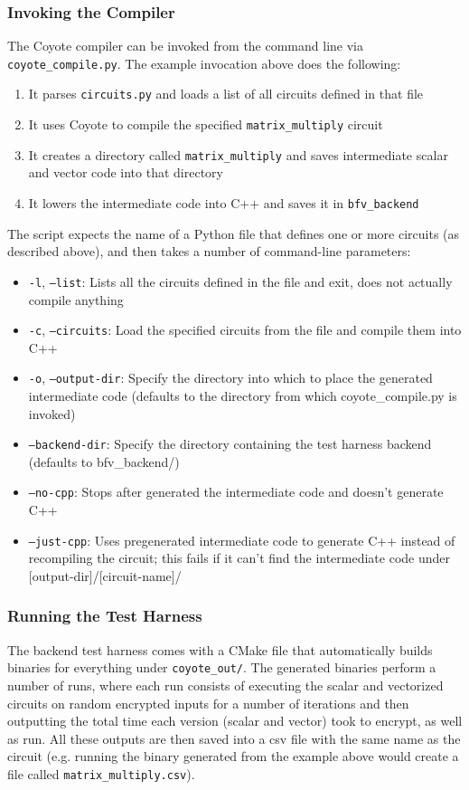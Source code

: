 \subsubsection{Invoking the Compiler}
The Coyote compiler can be invoked from the command line via {\tt coyote\_compile.py}. The example invocation above does the following:
\begin{enumerate}
    \item It parses {\tt circuits.py} and loads a list of all circuits defined in that file
    \item It uses Coyote to compile the specified {\tt matrix\_multiply} circuit
    \item It creates a directory called {\tt matrix\_multiply} and saves intermediate scalar and vector code into that directory
    \item It lowers the intermediate code into C++ and saves it in {\tt bfv\_backend}
\end{enumerate}
The script expects the name of a Python file that defines one or more circuits (as described above), and then takes a number of command-line parameters:
\begin{itemize}
    \item {\tt -l}, {\tt --list}: Lists all the circuits defined in the file and exit, does not actually compile anything
    \item {\tt -c}, {\tt --circuits}: Load the specified circuits from the file and compile them into C++
    \item {\tt -o}, {\tt --output-dir}: Specify the directory into which to place the generated intermediate code (defaults to the directory from which coyote\_compile.py is invoked)
    \item {\tt --backend-dir}: Specify the directory containing the test harness backend (defaults to bfv\_backend/)
    \item {\tt --no-cpp}: Stops after generated the intermediate code and doesn't generate C++
    \item {\tt --just-cpp}: Uses pregenerated intermediate code to generate C++ instead of recompiling the circuit; this fails if it can't find the intermediate code under [output-dir]/[circuit-name]/
\end{itemize}
\subsubsection{Running the Test Harness}
The backend test harness comes with a CMake file that automatically builds binaries for everything under {\tt coyote\_out/}. The generated binaries perform a number of runs, where each run consists of executing the scalar and vectorized circuits on random encrypted inputs for a number of iterations and then outputting the total time each version (scalar and vector) took to encrypt, as well as run. All these outputs are then saved into a csv file with the same name as the circuit (e.g. running the binary generated from the example above would create a file called {\tt matrix\_multiply.csv}).


